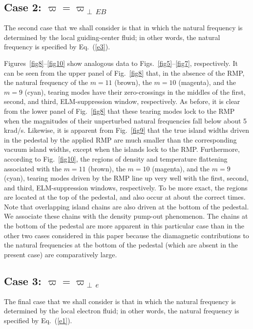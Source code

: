 \documentclass[12pt,prb,aps]{revtex4-1}
\begin{document}
\subsection{Case 2: $\varpi=\varpi_{\perp\,EB}$}
The second case that we shall consider is that in which the natural frequency is determined by the local guiding-center fluid; 
in other words, the natural frequency is specified by Eq.~(\ref{e3}). 

Figures~\ref{fig8}--\ref{fig10} show analogous data to Figs.~\ref{fig5}--\ref{fig7}, respectively. It can be seen from the
upper panel of Fig.~\ref{fig8} that, in the absence of the RMP,  the natural frequency of the $m=11$ (brown), the $m=10$ (magenta), and the $m=9$ (cyan), tearing modes have their
zero-crossings in the middles
of the first, second, and third, ELM-suppression window, respectively. As before, it is clear from the lower panel of Fig.~\ref{fig8} that these tearing modes lock
to the RMP when the magnitudes of their unperturbed natural frequencies fall below about 5 krad/s. 
Likewise, it is apparent from Fig.~\ref{fig9} that the true island widths driven in the pedestal by the applied
RMP are much smaller than the corresponding vacuum island widths, except when the islands lock to the RMP.
Furthermore, according to Fig.~\ref{fig10}, the regions of density and temperature flattening associated
with the $m=11$ (brown), the $m=10$ (magenta), and the $m=9$ (cyan), tearing modes driven by the RMP line up
very well with the first, second, and third, ELM-suppression windows, respectively. To be more exact, the regions are located at
the top of the pedestal, and also occur at about the correct times. Note that overlapping island chains
are also driven at the bottom of the pedestal. We associate these chains with the density pump-out phenomenon.\cite{hu,rf2} The chains at the bottom of the pedestal are more apparent
in this particular case than in the other two cases considered in this paper because the diamagnetic contributions to the natural frequencies at the bottom of the pedestal (which are absent
in the present case) are comparatively large. 

\subsection{Case 3: $\varpi=\varpi_{\perp\,e}$}
The final case that we shall consider is that in which the natural frequency is determined by the local electron fluid; 
in other words, the natural frequency is specified by Eq.~(\ref{e1}). 
\end{document}
